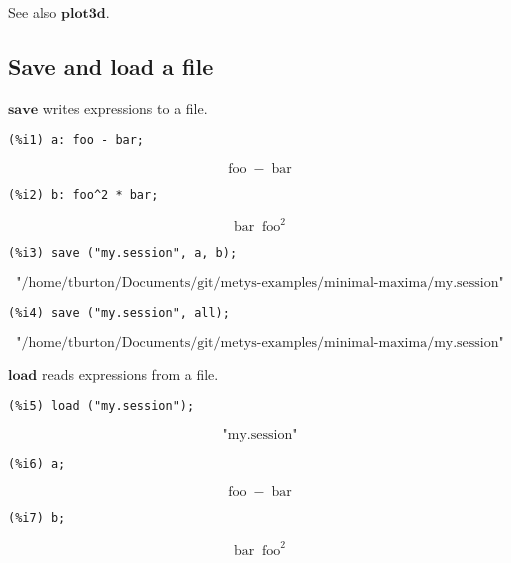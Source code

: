 \documentclass[12pt,leqno]{article}
\begin{document}
See also $\mathbf{plot3d}$.

\subsection{Save and load a file}

$\mathbf{save}$ writes expressions to a file.
\begin{verbatim}
(%i1) a: foo - bar;
\end{verbatim}
\begin{dmath}[number={\(\mathop{\mathrm{\%o}_{1}}\)}]
\mathop{\mathrm{foo}}-\mathop{\mathrm{bar}}
\end{dmath}
\begin{verbatim}
(%i2) b: foo^2 * bar;
\end{verbatim}
\begin{dmath}[number={\(\mathop{\mathrm{\%o}_{2}}\)}]
\mathop{\mathrm{bar}} {\mathop{\mathrm{foo}}}^{2}
\end{dmath}
\begin{verbatim}
(%i3) save ("my.session", a, b);
\end{verbatim}
\begin{dmath}[number={\(\mathop{\mathrm{\%o}_{3}}\)}]
\mbox{"/home/tburton/Documents/git/metys-examples/minimal-maxima/my.session"}
\end{dmath}
\begin{verbatim}
(%i4) save ("my.session", all);
\end{verbatim}
\begin{dmath}[number={\(\mathop{\mathrm{\%o}_{4}}\)}]
\mbox{"/home/tburton/Documents/git/metys-examples/minimal-maxima/my.session"}
\end{dmath}


$\mathbf{load}$ reads expressions from a file.
\begin{verbatim}
(%i5) load ("my.session");
\end{verbatim}
\begin{dmath}[number={\(\mathop{\mathrm{\%o}_{4}}\)}]
\mbox{"my.session"}
\end{dmath}
\begin{verbatim}
(%i6) a;
\end{verbatim}
\begin{dmath}[number={\(\mathop{\mathrm{\%o}_{5}}\)}]
\mathop{\mathrm{foo}}-\mathop{\mathrm{bar}}
\end{dmath}
\begin{verbatim}
(%i7) b;
\end{verbatim}
\begin{dmath}[number={\(\mathop{\mathrm{\%o}_{6}}\)}]
\mathop{\mathrm{bar}} {\mathop{\mathrm{foo}}}^{2}
\end{dmath}
\end{document}
